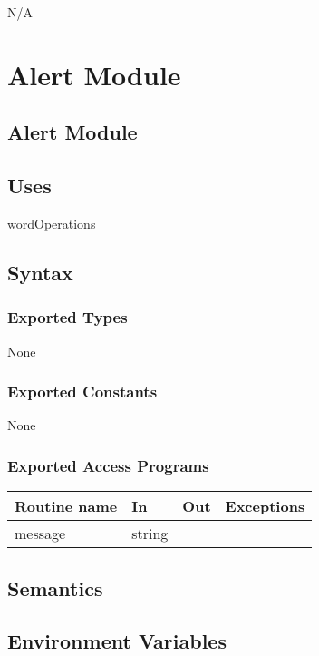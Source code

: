 \documentclass[12pt]{article}
\begin{document}
N/A

\newpage

\section {Alert Module}

\subsection* {Alert Module}

\subsection* {Uses}

wordOperations

\subsection* {Syntax}

\subsubsection* {Exported Types}

None

\subsubsection* {Exported Constants}

None

\subsubsection* {Exported Access Programs}

\begin{tabular}{| l | l | l | p{6cm} |}
\hline
\textbf{Routine name} & \textbf{In} & \textbf{Out} & \textbf{Exceptions}\\
\hline
message & string & ~ &  \\
\hline
\end{tabular}

\subsection* {Semantics}

\subsection*{Environment Variables}
\end{document}
